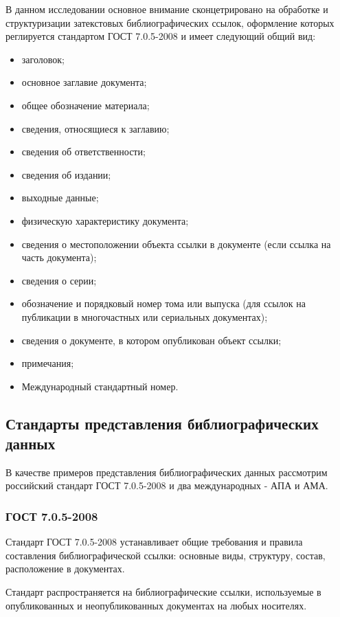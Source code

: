 В данном исследовании основное внимание сконцетрировано на обработке и структуризации затекстовых библиографических ссылок, оформление которых реглируется стандартом ГОСТ 7.0.5-2008 и имеет следующий общий вид:
\begin{itemize}
	\item заголовок;
	\item основное заглавие документа;
	\item общее обозначение материала;
	\item сведения, относящиеся к заглавию;
	\item сведения об ответственности;
	\item сведения об издании;
	\item выходные данные;
	\item физическую характеристику документа;
	\item сведения о местоположении объекта ссылки в документе (если ссылка на часть документа);
	\item сведения о серии;
	\item обозначение и порядковый номер тома или выпуска (для ссылок на публикации в многочастных или сериальных документах);
	\item сведения о документе, в котором опубликован объект ссылки;
	\item примечания;
	\item Международный стандартный номер.
\end{itemize}

\subsection{Стандарты представления библиографических данных}

В качестве примеров представления библиографических данных рассмотрим российский стандарт ГОСТ 7.0.5-2008 и два международных - АПА и АМА.

\subsubsection*{ГОСТ 7.0.5-2008}

Стандарт ГОСТ 7.0.5-2008 устанавливает общие требования и правила составления библиографической ссылки: основные виды, структуру, состав, расположение в документах.

Стандарт распространяется на библиографические ссылки, используемые в опубликованных и неопубликованных документах на любых носителях.

